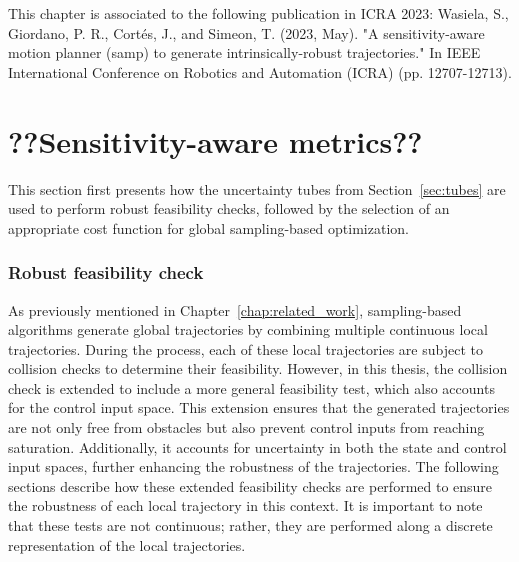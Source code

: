 This chapter is associated to the following publication in ICRA 2023: Wasiela, S., Giordano, P. R., Cortés, J., and Simeon, T. (2023, May). "A sensitivity-aware motion planner (samp) to generate intrinsically-robust trajectories." In IEEE International Conference on Robotics and Automation (ICRA) (pp. 12707-12713).

\section{??Sensitivity-aware metrics??}\label{sec:metrics}

This section first presents how the uncertainty tubes from Section~\ref{sec:tubes} are used to perform robust feasibility checks, followed by the selection of an appropriate cost function for global sampling-based optimization.

\subsubsection{Robust feasibility check}\label{sec:robust_CC}

As previously mentioned in Chapter~\ref{chap:related_work}, sampling-based algorithms generate global trajectories by combining multiple continuous local trajectories.
During the process, each of these local trajectories are subject to collision checks to determine their feasibility.
However, in this thesis, the collision check is extended to include a more general feasibility test, which also accounts for the control input space. 
This extension ensures that the generated trajectories are not only free from obstacles but also prevent control inputs from reaching saturation. 
Additionally, it accounts for uncertainty in both the state and control input spaces, further enhancing the robustness of the trajectories.
The following sections describe how these extended feasibility checks are performed to ensure the robustness of each local trajectory in this context.
It is important to note that these tests are not continuous; rather, they are performed along a discrete representation of the local trajectories.

